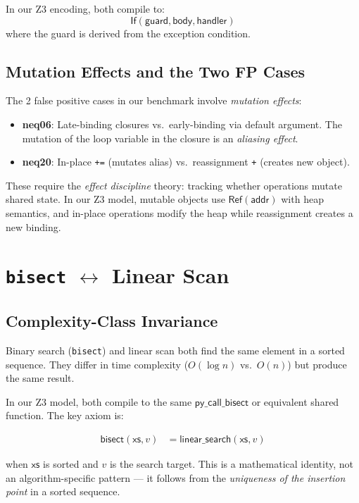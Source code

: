 \documentclass[11pt,a4paper]{report}
\theoremstyle{definition}
\theoremstyle{plain}
\begin{document}
In our Z3 encoding, both compile to:
\[
  \mathsf{If}(\mathsf{guard}, \mathsf{body}, \mathsf{handler})
\]
where the guard is derived from the exception condition.

\section{Mutation Effects and the Two FP Cases}

The 2 false positive cases in our benchmark involve \emph{mutation
effects}:
\begin{itemize}
  \item \textbf{neq06}: Late-binding closures vs.\ early-binding via
    default argument.  The mutation of the loop variable in the closure
    is an \emph{aliasing effect}.
  \item \textbf{neq20}: In-place \texttt{+=} (mutates alias) vs.\
    reassignment \texttt{+} (creates new object).
\end{itemize}

These require the \emph{effect discipline} theory: tracking whether
operations mutate shared state.  In our Z3 model, mutable objects use
$\mathsf{Ref}(\mathsf{addr})$ with heap semantics, and in-place
operations modify the heap while reassignment creates a new binding.


\chapter{\texttt{bisect} $\leftrightarrow$ Linear Scan}
\label{ch:bisect-linear}

\section{Complexity-Class Invariance}

Binary search (\texttt{bisect}) and linear scan both find the same
element in a sorted sequence.  They differ in time complexity
($O(\log n)$ vs.\ $O(n)$) but produce the same result.

In our Z3 model, both compile to the same $\mathsf{py\_call\_bisect}$
or equivalent shared function.  The key axiom is:

\begin{align}
  \mathsf{bisect}(\mathsf{xs}, v) &= \mathsf{linear\_search}(\mathsf{xs}, v)
\end{align}

when $\mathsf{xs}$ is sorted and $v$ is the search target.  This is a
mathematical identity, not an algorithm-specific pattern --- it follows
from the \emph{uniqueness of the insertion point} in a sorted sequence.
\end{document}
